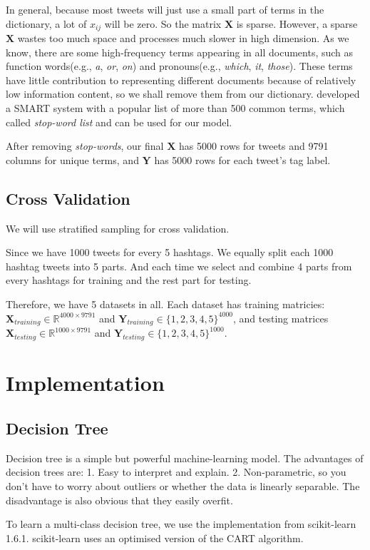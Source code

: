 \documentclass[letterpaper,11pt,twocolumn]{article}
\def\bfY{\mathbf Y}
\def\bfX{\mathbf X}
\def\R{\mathbb R}
\begin{document}
In general, because most tweets will just use a small part of terms in the dictionary, a lot of $x_{ij}$ will be zero. So the matrix $\bfX$ is sparse. However, a sparse $\bfX$ wastes too much space and processes much slower in high dimension. As we know, there are some high-frequency terms appearing in all documents, such as function words(e.g., \emph{a}, \emph{or}, \emph{on}) and pronouns(e.g., \emph{which}, \emph{it}, \emph{those}). These terms have little contribution to representing different documents because of relatively low information content, so we shall remove them from our dictionary. \cite{salton1971smart} developed a SMART system with a popular list of more than 500 common terms, which called \emph{stop-word list} and can be used for our model.

After removing \emph{stop-words}, our final $\bfX$ has 5000 rows for tweets and 9791 columns for unique terms, and $\bfY$ has 5000 rows for each tweet's tag label.
\subsection{Cross Validation}
We will use stratified sampling for cross validation.

Since we have 1000 tweets for every 5 hashtags. We equally split each 1000 hashtag tweets into 5 parts. And each time we select and combine 4 parts from every hashtags for training and the rest part for testing.

Therefore, we have 5 datasets in all. Each dataset has training matricies: $\bfX_{training} \in \R^{4000 \times 9791}$ and $\bfY_{training} \in \{1, 2, 3, 4, 5\}^{4000}$, and testing matrices $\bfX_{testing} \in \R^{1000 \times 9791}$ and $\bfY_{testing} \in \{1, 2, 3, 4, 5\}^{1000}$.

\section{Implementation}
\label{sec:impl}
\subsection{Decision Tree}
Decision tree is a simple but powerful machine-learning model. The advantages of decision trees are: 1. Easy to interpret and explain. 2. Non-parametric, so you don't have to worry about outliers or whether the data is linearly separable. The disadvantage is also obvious that they easily overfit.

To learn a multi-class decision tree, we use the implementation from scikit-learn 1.6.1. scikit-learn uses an optimised version of the CART algorithm.
\end{document}

